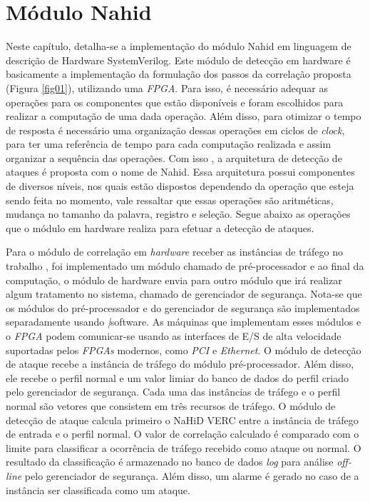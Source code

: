 \chapter{Módulo Nahid}
\label{CAP3}
Neste capítulo, detalha-se a implementação do módulo Nahid em linguagem de descrição de Hardware SystemVerilog. Este  módulo de detecção em hardware é basicamente a implementação da formulação dos passos da correlação proposta (Figura \ref{fig01}), utilizando uma \textit{FPGA}. Para isso, é necessário adequar  as operações para os componentes que estão disponíveis e foram escolhidos para realizar a computação de uma dada operação.  Além disso, para otimizar o tempo de resposta é necessário uma organização dessas operações em ciclos de \textit{clock}, para ter uma referência de tempo  para cada computação realizada e assim organizar a sequência das operações. Com isso , a arquitetura de detecção de ataques é proposta com o nome de Nahid. Essa arquitetura possui componentes de diversos níveis, nos quais estão dispostos dependendo da operação que esteja sendo feita no momento, vale ressaltar que essas operações são aritméticas, mudança no tamanho da palavra, registro e seleção. Segue abaixo as operações que o módulo em hardware realiza para efetuar a detecção de ataques.

Para o módulo de correlação em \textit{hardware} receber as instâncias de tráfego no trabalho \cite{HOQUE201748}, foi implementado  um módulo  chamado de pré-processador e ao final da computação, o módulo de hardware envia para outro módulo que irá realizar algum tratamento no sistema, chamado de gerenciador de segurança. Nota-se que os módulos do pré-processador e do gerenciador de segurança são implementados separadamente usando \textit|{software}. As máquinas que implementam esses módulos e o \textit{FPGA} podem comunicar-se usando as interfaces de E/S de alta velocidade suportadas pelos \textit{FPGAs} modernos, como \textit{PCI} e \textit{Ethernet}. O módulo de detecção de ataque recebe a instância de tráfego do módulo pré-processador. Além disso, ele recebe o perfil normal e um valor limiar do banco de dados do perfil criado pelo gerenciador de segurança. Cada uma das instâncias de tráfego e o perfil normal são vetores que consistem em três recursos de tráfego. O módulo de detecção de ataque calcula primeiro o NaHiD VERC entre a instância de tráfego de entrada e o perfil normal. O valor de correlação calculado é comparado com o limite para classificar a ocorrência de tráfego recebido como ataque ou normal. O resultado da classificação é armazenado no banco de dados \textit{log} para análise \textit{off-line} pelo gerenciador de segurança. Além disso, um alarme é gerado no caso de a instância ser classificada como um ataque.

